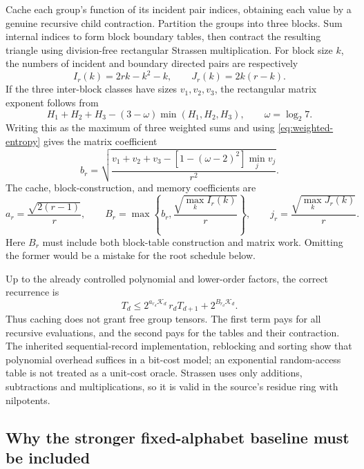 Cache each group's function of its incident pair indices, obtaining
each value by a genuine recursive child contraction. Partition the
groups into three blocks. Sum internal indices to form block boundary
tables, then contract the resulting triangle using division-free
rectangular Strassen multiplication. For block size $k$, the numbers
of incident and boundary directed pairs are respectively
\[
 I_r(k)=2rk-k^2-k,\qquad J_r(k)=2k(r-k).
\]
If the three inter-block classes have sizes $v_1,v_2,v_3$, the rectangular
matrix exponent follows from
\[
 H_1+H_2+H_3-(3-\omega)\min(H_1,H_2,H_3),\qquad \omega=\log_2 7.
\]
Writing this as the maximum of three weighted sums and using
\eqref{eq:weighted-entropy} gives the matrix coefficient
\begin{equation}\label{eq:matrix-b}
 b_r=\sqrt{\frac{v_1+v_2+v_3-[1-(\omega-2)^2]\min_jv_j}{r^2}}.
\end{equation}
The cache, block-construction, and memory coefficients are
\begin{equation}\label{eq:cache-factors}
 a_r=\frac{\sqrt{2(r-1)}}r,\qquad
 B_r=\max\left\{b_r,\frac{\sqrt{\max_k I_r(k)}}r\right\},\qquad
 j_r=\frac{\sqrt{\max_k J_r(k)}}r.
\end{equation}
Here $B_r$ must include both block-table construction and matrix work.
Omitting the former would be a mistake for the root schedule below.

Up to the already controlled polynomial and lower-order factors, the
correct recurrence is
\begin{equation}\label{eq:cache-recurrence}
 T_d\le2^{a_{r_d}\mathcal K_d}\,r_dT_{d+1}
           +2^{B_{r_d}\mathcal K_d}.
\end{equation}
Thus caching does not grant free group tensors. The first term pays for
all recursive evaluations, and the second pays for the tables and their
contraction. The inherited sequential-record implementation, reblocking
and sorting show that polynomial overhead suffices in a bit-cost model;
an exponential random-access table is not treated as a unit-cost oracle.
Strassen uses only additions, subtractions and multiplications, so it is
valid in the source's residue ring with nilpotents.

\subsection{Why the stronger fixed-alphabet baseline must be included}

